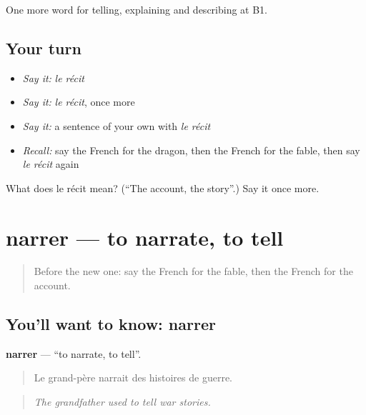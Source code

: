 \begin{grammarlens}[title={What you've built}]
One more word for telling, explaining and describing at B1.
\end{grammarlens}

\subsection*{Your turn}
\begin{itemize}
\raggedright
  \item \emph{Say it:} \emph{le récit}
  \item \emph{Say it:} \emph{le récit}, once more
  \item \emph{Say it:} a sentence of your own with \emph{le récit}
  \item \emph{Recall:} say the French for the dragon, then the French for the fable, then say \emph{le récit} again
\end{itemize}

\begin{tcolorbox}[breakable,colback=teal!4,colframe=teal!35!black,title={Before you move on}]
What does le récit mean? (\textquotedblleft{}The account, the story\textquotedblright{}.) Say it once more.
\end{tcolorbox}
\section[narrer]{narrer — to narrate, to tell}

\label{lesson:FR-C322-narrer}



\begin{quote}
Before the new one: say the French for the fable, then the French for the account.
\end{quote}

\subsection*{You'll want to know: narrer}
\textbf{narrer} — \textquotedblleft{}to narrate, to tell\textquotedblright{}.

\begin{quote}
Le grand-père narrait des histoires de guerre.
\end{quote}

\begin{quote}
\emph{The grandfather used to tell war stories.}
\end{quote}

